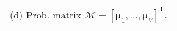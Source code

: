 \scriptsize
\begin{tabular}[t]{l}
 (d) Prob. matrix \tiny $\mathcal{M}=[\bm{\mu}_1,\ldots, \bm{\mu}_V]^\mathsf{T}.$
\end{tabular}